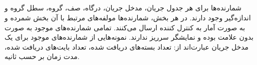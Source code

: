 \subsection{}
شمارنده‌ها برای هر جدول جریان، مدخل جریان، درگاه، صف، گروه، سطل گروه و اندازه‌گیر وجود دارند. در هر بخش، شمارنده‌ها مولفه‌های مرتبط با آن بخش شمرده و به صورت آمار به کنترل کننده ارسال می‌کنند. تمامی شمارنده‌های موجود به صورت بدون علامت بوده و نمایشگر سرریز ندارند. نمونه‌هایی از شمارنده‌های موجود برای یک مدخل جریان عبارت‌اند از: تعداد بسته‌های دریافت شده، تعداد بایت‌‌های دریافت شده، مدت زمان بر حسب ثانیه.
